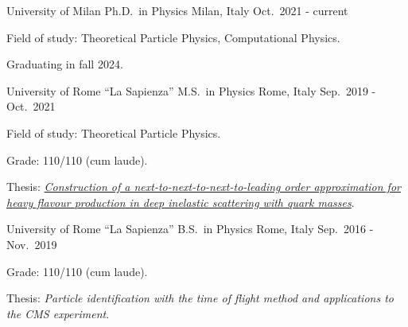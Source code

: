 

\begin{cventries}

    \cventry
        {University of Milan} %
        {Ph.D.\ in Physics} %
        {Milan, Italy} %
        {Oct.\ 2021 - current} %
        {
        \begin{cvitems} %
            \item Field of study: Theoretical Particle Physics, Computational Physics.
            \item Graduating in fall 2024.
        \end{cvitems}
        }

    \cventry
        {University of Rome ``La Sapienza''} %
        {M.S.\ in Physics} %
        {Rome, Italy} %
        {Sep.\ 2019 - Oct.\ 2021} %
        {
        \begin{cvitems} %
            \item Field of study: Theoretical Particle Physics.
            \item Grade: 110/110 (cum laude).
            \item Thesis: \href{https://arxiv.org/pdf/2401.12139.pdf}{\emph{Construction of a next-to-next-to-next-to-leading order approximation for heavy flavour production in deep inelastic scattering with quark masses}}.
        \end{cvitems}
        }

    \cventry
        {University of Rome ``La Sapienza''} %
        {B.S.\ in Physics} %
        {Rome, Italy} %
        {Sep.\ 2016 - Nov.\ 2019} %
        {
        \begin{cvitems} %
            \item Grade: 110/110 (cum laude).
            \item Thesis: \emph{Particle identification with the time of flight method and applications to the CMS experiment}.
        \end{cvitems}
        }

\end{cventries}